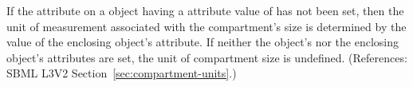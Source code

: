 If the attribute  on a \Compartment object having a
 attribute value of  has not been set, then
the unit of measurement associated with the compartment's size is
determined by the value of the enclosing \Model object's
 attribute.  If neither the \Compartment object's
 nor the enclosing \Model object's 
attributes are set, the unit of compartment size is undefined.
(References: SBML L3V2 Section~\ref{sec:compartment-units}.)
